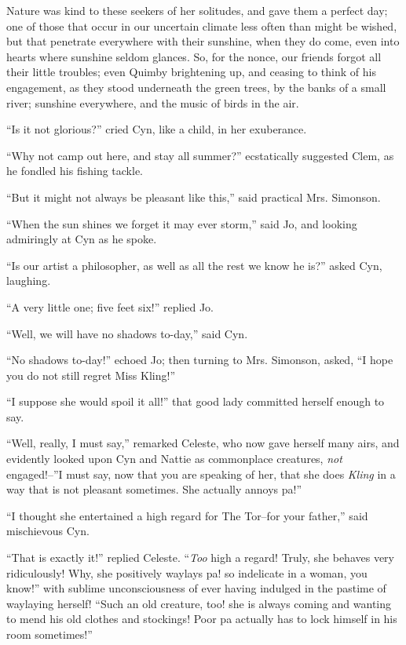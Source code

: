 Nature was kind to these seekers of her solitudes, and gave them a
perfect day; one of those that occur in our uncertain climate less often
than might be wished, but that penetrate everywhere with their sunshine,
when they do come, even into hearts where sunshine seldom glances. So,
for the nonce, our friends forgot all their little troubles; even Quimby
brightening up, and ceasing to think of his engagement, as they stood
underneath the green trees, by the banks of a small river; sunshine
everywhere, and the music of birds in the air.

``Is it not glorious?'' cried Cyn, like a child, in her exuberance.

``Why not camp out here, and stay all summer?'' ecstatically suggested
Clem, as he fondled his fishing tackle.

``But it might not always be pleasant like this,'' said practical Mrs.
Simonson.

``When the sun shines we forget it may ever storm,'' said Jo, and looking
admiringly at Cyn as he spoke.

``Is our artist a philosopher, as well as all the rest we know he is?''
asked Cyn, laughing.

``A very little one; five feet six!'' replied Jo.

``Well, we will have no shadows to-day,'' said Cyn.

``No shadows to-day!'' echoed Jo; then turning to Mrs. Simonson, asked, ``I
hope you do not still regret Miss Kling!''

``I suppose she would spoil it all!'' that good lady committed herself
enough to say.

``Well, really, I must say,'' remarked Celeste, who now gave herself many
airs, and evidently looked upon Cyn and Nattie as commonplace creatures,
\emph{not} engaged!--''I must say, now that you are speaking of her, that she
does \emph{Kling} in a way that is not pleasant sometimes. She actually annoys
pa!''

``I thought she entertained a high regard for The Tor--for your father,''
said mischievous Cyn.

``That is exactly it!'' replied Celeste. ``\emph{Too} high a regard! Truly, she
behaves very ridiculously! Why, she positively waylays pa! so indelicate
in a woman, you know!'' with sublime unconsciousness of ever having
indulged in the pastime of waylaying herself! ``Such an old creature,
too! she is always coming and wanting to mend his old clothes and
stockings! Poor pa actually has to lock himself in his room sometimes!''

